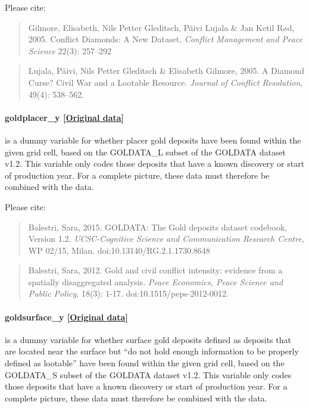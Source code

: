 \documentclass[]{book}
\begin{document}
Please cite:

\begin{quote}
Gilmore, Elisabeth, Nils Petter Gleditsch, Päivi Lujala \& Jan Ketil
Rød, 2005. Conflict Diamonds: A New Dataset, \emph{Conflict Management
and Peace Science} 22(3): 257--292
\end{quote}

\begin{quote}
Lujala, Päivi, Nils Petter Gleditsch \& Elisabeth Gilmore, 2005. A
Diamond Curse? Civil War and a Lootable Resource. \emph{Journal of
Conflict Resolution}, 49(4): 538--562.
\end{quote}

\paragraph{goldplacer\_y
{[}\href{http://www.researchgate.net/profile/Sara_Balestri}{Original
data}{]}}\label{goldplacer-y}

is a dummy variable for whether placer gold deposits have been found
within the given grid cell, based on the GOLDATA\_L subset of the
GOLDATA dataset v1.2. This variable only codes those deposits that have
a known discovery or start of production year. For a complete picture,
these data must therefore be combined with the 
data.

Please cite:

\begin{quote}
Balestri, Sara, 2015. GOLDATA: The Gold deposits dataset codebook,
Version 1.2. \emph{UCSC-Cognitive Science and Communication Research Centre},
WP 02/15, Milan. doi:10.13140/RG.2.1.1730.8648
\end{quote}

\begin{quote}
Balestri, Sara, 2012. Gold and civil conflict intensity: evidence from a
spatially disaggregated analysis. \emph{Peace Economics, Peace Science
and Public Policy}, 18(3): 1-17. doi:10.1515/peps-2012-0012.
\end{quote}

\paragraph{goldsurface\_y
{[}\href{http://www.researchgate.net/profile/Sara_Balestri}{Original
data}{]}}\label{goldsurface-y}

is a dummy variable for whether surface gold deposits defined as
deposits that are located near the surface but ``do not hold enough
information to be properly defined as lootable'' have been found within
the given grid cell, based on the GOLDATA\_S subset of the GOLDATA
dataset v1.2. This variable only codes those deposits that have a known
discovery or start of production year. For a complete picture, these
data must therefore be combined with the  data.
\end{document}
